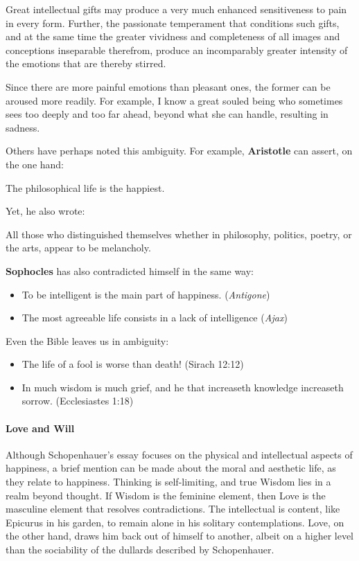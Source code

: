 \begin{quotex}
Great intellectual gifts may produce a very much enhanced sensitiveness to pain in every form. Further, the passionate
temperament that conditions such gifts, and at the same time the greater vividness and completeness of all images and
conceptions inseparable therefrom, produce an incomparably greater intensity of the emotions that are thereby stirred. 

\end{quotex}
Since there are more painful emotions than pleasant ones, the former can be aroused more readily. For example, I know a
great souled being who sometimes sees too deeply and too far ahead, beyond what she can handle, resulting in sadness.

Others have perhaps noted this ambiguity. For example, \textbf{Aristotle} can assert, on the one hand:

\begin{quotex}
The philosophical life is the happiest. 

\end{quotex}
Yet, he also wrote:

\begin{quotex}
All those who distinguished themselves whether in philosophy, politics, poetry, or the arts, appear to be melancholy. 

\end{quotex}
\textbf{Sophocles} has also contradicted himself in the same way:

\begin{itemize}
\item To be intelligent is the main part of happiness. (\emph{Antigone}) 
\item The most agreeable life consists in a lack of intelligence (\emph{Ajax}) 
\end{itemize}
Even the Bible leaves us in ambiguity:

\begin{itemize}
\item The life of a fool is worse than death! (Sirach 12:12) 
\item In much wisdom is much grief, and he that increaseth knowledge increaseth sorrow. (Ecclesiastes 1:18) 
\end{itemize}

\paragraph{Love and Will}
Although Schopenhauer’s essay focuses on the physical and intellectual aspects of happiness, a brief mention
can be made about the moral and aesthetic life, as they relate to happiness. Thinking is self-limiting, and true Wisdom
lies in a realm beyond thought. If Wisdom is the feminine element, then Love is the masculine element that resolves
contradictions. The intellectual is content, like Epicurus in his garden, to remain alone in his solitary
contemplations. Love, on the other hand, draws him back out of himself to another, albeit on a higher level than the
sociability of the dullards described by Schopenhauer.

